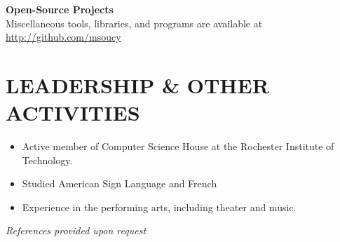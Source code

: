 \documentclass[line]{res}
\newcommand{\project}[2][]{{\bf #2}\hfill #1\\}
\begin{document}
\begin{resume}
	\project                         {Open-Source Projects}
	Miscellaneous tools, libraries, and programs are available at \url{http://github.com/msoucy}

\section{LEADERSHIP \& OTHER ACTIVITIES}
	\begin{itemize}
		\item Active member of Computer Science House at the Rochester Institute of Technology.
		\item Studied American Sign Language and French
		\item Experience in the performing arts, including theater and music.
	\end{itemize}

\begin{center}\vspace{-0.25in}\emph{References provided upon request\\[8pt]}\end{center}

\end{resume}
\end{document}
